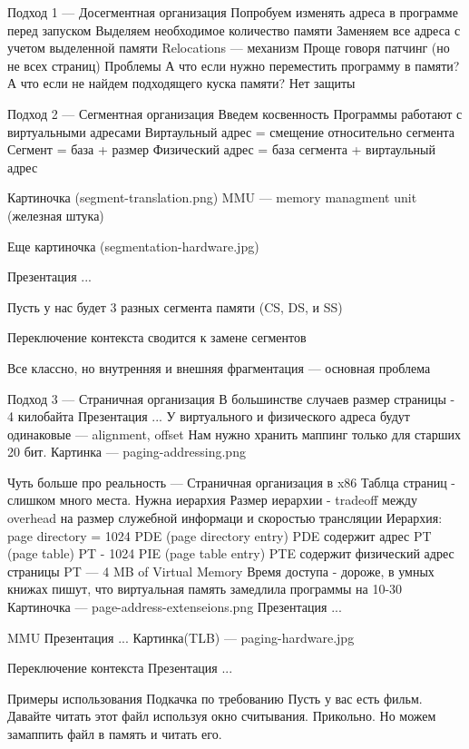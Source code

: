 Подход 1 --- Досегментная организация
Попробуем изменять адреса в программе перед запуском
    Выделяем необходимое количество памяти
    Заменяем все адреса с учетом выделенной памяти
    Relocations --- механизм 
    Проще говоря патчинг (но не всех страниц)
Проблемы
    А что если нужно переместить программу в памяти?
    А что если не найдем подходящего куска памяти?
    Нет защиты

Подход 2 --- Сегментная организация
Введем косвенность
    Программы работают с виртуальными адресами
    Виртаульный адрес = смещение относительно сегмента
    Сегмент = база + размер
    Физический адрес = база сегмента + виртаульный адрес

    Картиночка (segment-translation.png)
    MMU --- memory managment unit (железная штука)

    Еще картиночка (segmentation-hardware.jpg)

    Презентация ...

    Пусть у нас будет 3 разных сегмента памяти (CS, DS, и SS)

Переключение контекста сводится к замене сегментов

Все классно, но внутренняя и внешняя фрагментация --- основная проблема
    
Подход 3 --- Страничная организация
В большинстве случаев размер страницы - 4 килобайта
Презентация ...
У виртуального и физического адреса будут одинаковые --- alignment, offset
Нам нужно хранить маппинг только для старших 20 бит.
Картинка --- paging-addressing.png

Чуть больше про реальность --- Страничная организация в x86
Таблца страниц - слишком много места. Нужна иерархия
Размер иерархии - tradeoff между overhead на размер служебной информаци и скоростью трансляции
Иерархия:
    page directory = 1024 PDE (page directory entry)
        PDE содержит адрес PT (page table)
    PT - 1024 PIE (page table entry)
        PTE содержит физический адрес страницы
        PT --- 4 MB of Virtual Memory
Время доступа - дороже, в умных книжах пишут, что виртуальная память замедлила программы на 10-30%
Картиночка --- page-address-extenseions.png
Презентация ...

MMU 
Презентация ...
Картинка(TLB) --- paging-hardware.jpg

Переключение контекста
Презентация ...

Примеры использования
Подкачка по требованию
    Пусть у вас есть фильм. Давайте читать этот файл используя
    окно считывания. Прикольно. Но можем замаппить файл в память 
    и читать его.

